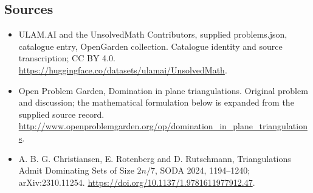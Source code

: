 \documentclass[11pt,a4paper]{article}
\begin{document}
\subsection{Sources}
\begin{itemize}
\item[S1] ULAM.AI and the UnsolvedMath Contributors, supplied problems.json, catalogue entry, OpenGarden collection. Catalogue identity and source transcription; CC BY 4.0.
\url{https://huggingface.co/datasets/ulamai/UnsolvedMath}.
\item[S2] Open Problem Garden, Domination in plane triangulations. Original problem and discussion; the mathematical formulation below is expanded from the supplied source record.
\url{http://www.openproblemgarden.org/op/domination_in_plane_triangulations}.

\item[S3] A. B. G. Christiansen, E. Rotenberg and D. Rutschmann, Triangulations Admit Dominating Sets of Size $2n/7$, SODA 2024, 1194--1240; arXiv:2310.11254.
\url{https://doi.org/10.1137/1.9781611977912.47}.
\end{itemize}
\end{document}
